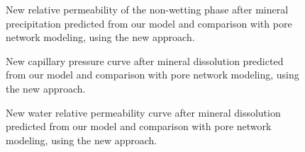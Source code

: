 \documentclass[preprint,12pt,authoryear]{elsarticle}
\begin{document}
\begin{figure} 
\centering \setlength\figureheight{6cm} \setlength\figurewidth{6cm}  \caption{New relative permeability of the non-wetting phase after mineral precipitation predicted from our model and comparison with pore network modeling, using the new approach.} \label{fig:KrgPcp} 
\end{figure}

\begin{figure} 
\centering \setlength\figureheight{6cm} \setlength\figurewidth{6cm}  \caption{New capillary pressure curve after mineral dissolution predicted from our model and comparison with pore network modeling, using the new approach.} \label{fig:PcDss} 
\end{figure}

\begin{figure} 
\centering\setlength\figureheight{6cm} \setlength\figurewidth{6cm}  \caption{New water relative permeability curve after mineral dissolution predicted from our model and comparison with pore network modeling, using the new approach.} \label{fig:KrwDss} 
\end{figure}
\end{document}
